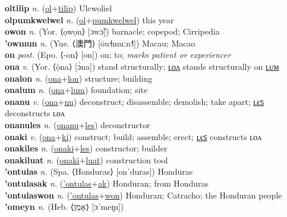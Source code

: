 \textbf{oltilip} \textit{n.} (\hyperref[ol]{ol}+\hyperref[tilip]{tilip})
Ulcwoliel \label{oltilip} \\
\textbf{olpumkwelwel} \textit{n.} (\hyperref[ol]{ol}+\hyperref[pumkwelwel]{pumkwelwel})
this year \label{olpumkwelwel} \\
\textbf{owon} \textit{n.} (Yor. ⟨ọwọn⟩ [ɔwɔ̃])
barnacle; copepod; Cirripedia \label{owon} \\
\textbf{'owmun} \textit{n.} (Yue. ⟨澳門⟩ [ōu˧muːn˧˥])
Macau; Macao \label{'owmun} \\
\textbf{on} \textit{post.} (Epo. ⟨-on⟩ [on])
on; to; \textit{marks patient or experiencer} \label{on} \\
\textbf{ona} \textit{v.} (Yor. ⟨ọ̀na⟩ [ɔ̀na])
stand structurally; \hyperref[onalon]{ʟᴏᴧ} stands structurally on \hyperref[onalum]{ʟᴜᴍ} \label{ona} \\
\textbf{onalon} \textit{n.} (\hyperref[ona]{ona}+\hyperref[lon]{lon})
structure; building \label{onalon} \\
\textbf{onalum} \textit{n.} (\hyperref[ona]{ona}+\hyperref[lum]{lum})
foundation; site \label{onalum} \\
\textbf{onanu} \textit{v.} (\hyperref[ona]{ona}+\hyperref[nu]{nu})
deconstruct; disassemble; demolish; take apart; \hyperref[onanules]{ʟєꜱ} deconstructs ʟᴏᴧ \label{onanu} \\
\textbf{onanules} \textit{n.} (\hyperref[onanu]{onanu}+\hyperref[les]{les})
deconstructor \label{onanules} \\
\textbf{onaki} \textit{v.} (\hyperref[ona]{ona}+\hyperref[ki]{ki})
construct; build; assemble; erect; \hyperref[onakiles]{ʟєꜱ} constructs ʟᴏᴧ \label{onaki} \\
\textbf{onakiles} \textit{n.} (\hyperref[onaki]{onaki}+\hyperref[les]{les})
constructor; builder \label{onakiles} \\
\textbf{onakiluat} \textit{n.} (\hyperref[onaki]{onaki}+\hyperref[luat]{luat})
construction tool \label{onakiluat} \\
\textbf{'ontulas} \textit{n.} (Spa. ⟨Honduras⟩ [onˈduɾas])
Honduras \label{'ontulas} \\
\textbf{'ontulasak} \textit{n.} (\hyperref['ontulas]{'ontulas}+\hyperref[ak]{ak})
Honduran; from Honduras \label{'ontulasak} \\
\textbf{'ontulaswon} \textit{n.} (\hyperref['ontulas]{'ontulas}+\hyperref[won]{won})
Honduran; Catracho; the Honduran people \label{'ontulaswon} \\
\textbf{'omeyn} \textit{n.} (Heb. ⟨אָמֵן⟩ [ɔˈmeɪ̯n])
